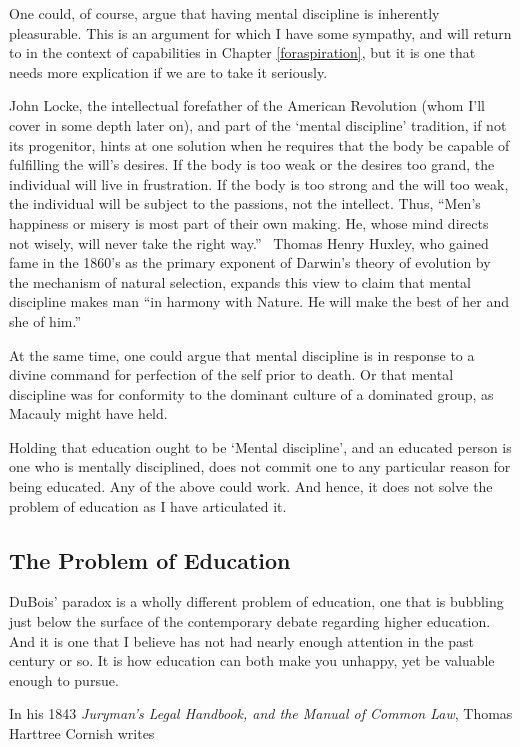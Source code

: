 One could, of course, argue that having mental discipline is inherently pleasurable. This is an argument for which I have some sympathy, and will return to in the context of capabilities in Chapter \ref{foraspiration}, but it is one that needs more explication if we are to take it seriously.

John Locke, the intellectual forefather of the American Revolution (whom I'll cover in some depth later on), and part of the `mental discipline' tradition, if not its progenitor, hints at one solution when he requires that the body be capable of fulfilling the will's desires. If the body is too weak or the desires too grand, the individual will live in frustration. If the body is too strong and the will too weak, the individual will be subject to the passions, not the intellect. Thus, ``Men's happiness or misery is most part of their own making. He, whose mind directs not wisely, will never take the right way.''~\citep[p. 6]{Locke:1895va} Thomas Henry Huxley, who gained fame in the 1860's as the primary exponent of Darwin's theory of evolution by the mechanism of natural selection, expands this view to claim that mental discipline makes man ``in harmony with Nature. He will make the best of her and she of him.'' ~\citep{Huxley:2009ty}

At the same time, one could argue that mental discipline is in response to a divine command for perfection of the self prior to death. Or that mental discipline was for conformity to the dominant culture of a dominated group, as Macauly might have held.

Holding that education ought to be `Mental discipline', and an educated person is one who is mentally disciplined, does not commit one to any particular reason for being educated. Any of the above could work. And hence, it does not solve the problem of education as I have articulated it. 

\subsection{The Problem of Education}
\label{theproblemofeducation}

DuBois' paradox is a wholly different problem of education, one that is bubbling just below the surface of the contemporary debate regarding higher education. And it is one that I believe has not had nearly enough attention in the past century or so. It is how education can both make you unhappy, yet be valuable enough to pursue. 

In his 1843 \emph{Juryman's Legal Handbook, and the Manual of Common Law}, Thomas Harttree Cornish writes 

